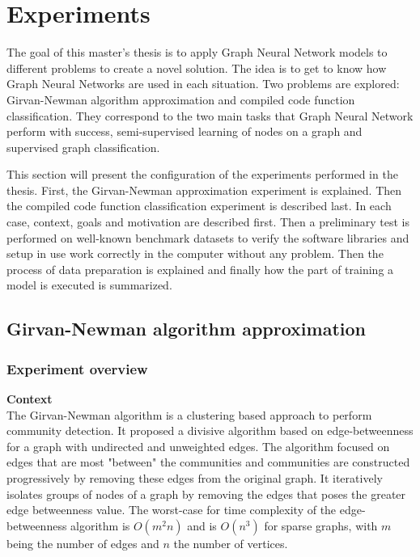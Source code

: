 \newpage
\section{Experiments}

The goal of this master's thesis is to apply Graph Neural Network models to different problems to create a novel solution. The idea is to get to know how Graph Neural Networks are used in each situation. Two problems are explored: Girvan-Newman algorithm approximation and compiled code function classification. They correspond to the two main tasks that Graph Neural Network perform with success, semi-supervised learning of nodes on a graph and supervised graph classification. 

This section will present the configuration of the experiments performed in the thesis. First, the Girvan-Newman approximation experiment is explained. Then the compiled code function classification experiment is described last. In each case, context, goals and motivation are described first. Then a preliminary test is performed on well-known benchmark datasets to verify the software libraries and setup in use work correctly in the computer without any problem. Then the process of data preparation is explained and finally how the part of training a model is executed is summarized.





\subsection{Girvan-Newman algorithm approximation}


\subsubsection{Experiment overview}

\textbf{Context} \\
The Girvan-Newman algorithm is a clustering based approach to perform community detection. It proposed a divisive algorithm based on edge-betweenness for a graph with undirected and unweighted edges. The algorithm focused on edges that are most "between" the communities and communities are constructed progressively by removing these edges from the original graph. It iteratively isolates groups of nodes of a graph by removing the edges that poses the greater edge betweenness value. The worst-case for time complexity of the edge-betweenness algorithm is $O(m^2n)$ and is $O(n^3)$ for sparse graphs, with $m$ being the number of edges and $n$ the number of vertices. 

